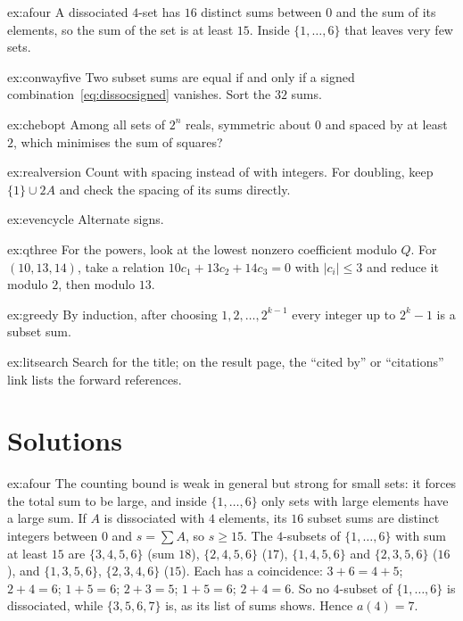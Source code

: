 \begin{hint}{ex:afour}
A dissociated $4$-set has $16$ distinct sums between $0$ and the sum of its elements, so the sum of the set is at least $15$. Inside $\{1,\dots,6\}$ that leaves
very few sets.
\end{hint}

\begin{hint}{ex:conwayfive}
Two subset sums are equal if and only if a signed combination~\eqref{eq:dissocsigned} vanishes. Sort the $32$ sums.
\end{hint}

\begin{hint}{ex:chebopt}
Among all sets of $2^n$ reals, symmetric about $0$ and spaced by at least $2$, which minimises the sum of squares?
\end{hint}

\begin{hint}{ex:realversion}
Count with spacing instead of with integers. For doubling, keep $\{1\}\cup2A$ and check the spacing of its sums directly.
\end{hint}

\begin{hint}{ex:evencycle}
Alternate signs.
\end{hint}

\begin{hint}{ex:qthree}
For the powers, look at the lowest nonzero coefficient modulo $Q$. For $(10,13,14)$, take a relation $10c_1+13c_2+14c_3=0$ with $|c_i|\le3$ and reduce it
modulo $2$, then modulo $13$.
\end{hint}

\begin{hint}{ex:greedy}
By induction, after choosing $1,2,\dots,2^{k-1}$ every integer up to $2^k-1$ is a subset sum.
\end{hint}

\begin{hint}{ex:litsearch}
Search for the title; on the result page, the ``cited by'' or ``citations'' link lists the forward references.
\end{hint}

\section{Solutions}

\begin{solution}{ex:afour}
\idea The counting bound is weak in general but strong for small sets: it forces the total sum to be large, and inside $\{1,\dots,6\}$ only
sets with large elements have a large sum.
\writeup If $A$ is dissociated with $4$ elements, its $16$ subset sums are distinct integers between $0$ and $s=\sum A$, so $s\ge15$. The $4$-subsets of
$\{1,\dots,6\}$ with sum at least $15$ are $\{3,4,5,6\}$ (sum $18$), $\{2,4,5,6\}$ ($17$), $\{1,4,5,6\}$ and $\{2,3,5,6\}$ ($16$), and $\{1,3,5,6\}$, $\{2,3,4,6\}$ ($15$).
Each has a coincidence: $3+6=4+5$; $2+4=6$; $1+5=6$; $2+3=5$; $1+5=6$; $2+4=6$. So no $4$-subset of $\{1,\dots,6\}$ is dissociated, while
$\{3,5,6,7\}$ is, as its list of sums shows. Hence $a(4)=7$.
\end{solution}


